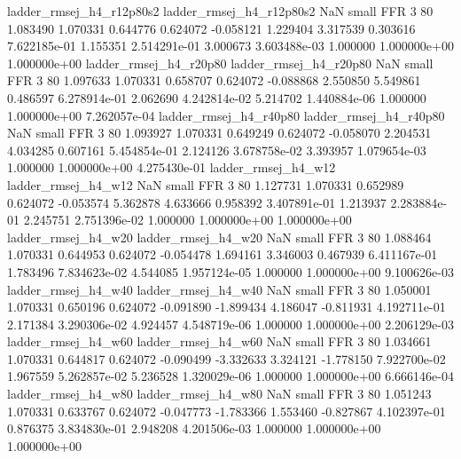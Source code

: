 ladder_rmsej_h4_r12p80s2 ladder_rmsej_h4_r12p80s2                   NaN      small      FFR                 3 80 1.083490       1.070331 0.644776       0.624072   -0.058121      1.229404      3.317539     0.303616   7.622185e-01  1.155351 2.514291e-01     3.000673   3.603488e-03            1.000000    1.000000e+00        1.000000e+00
  ladder_rmsej_h4_r20p80   ladder_rmsej_h4_r20p80                   NaN      small      FFR                 3 80 1.097633       1.070331 0.658707       0.624072   -0.088868      2.550850      5.549861     0.486597   6.278914e-01  2.062690 4.242814e-02     5.214702   1.440884e-06            1.000000    1.000000e+00        7.262057e-04
  ladder_rmsej_h4_r40p80   ladder_rmsej_h4_r40p80                   NaN      small      FFR                 3 80 1.093927       1.070331 0.649249       0.624072   -0.058070      2.204531      4.034285     0.607161   5.454854e-01  2.124126 3.678758e-02     3.393957   1.079654e-03            1.000000    1.000000e+00        4.275430e-01
     ladder_rmsej_h4_w12      ladder_rmsej_h4_w12                   NaN      small      FFR                 3 80 1.127731       1.070331 0.652989       0.624072   -0.053574      5.362878      4.633666     0.958392   3.407891e-01  1.213937 2.283884e-01     2.245751   2.751396e-02            1.000000    1.000000e+00        1.000000e+00
     ladder_rmsej_h4_w20      ladder_rmsej_h4_w20                   NaN      small      FFR                 3 80 1.088464       1.070331 0.644953       0.624072   -0.054478      1.694161      3.346003     0.467939   6.411167e-01  1.783496 7.834623e-02     4.544085   1.957124e-05            1.000000    1.000000e+00        9.100626e-03
     ladder_rmsej_h4_w40      ladder_rmsej_h4_w40                   NaN      small      FFR                 3 80 1.050001       1.070331 0.650196       0.624072   -0.091890     -1.899434      4.186047    -0.811931   4.192711e-01  2.171384 3.290306e-02     4.924457   4.548719e-06            1.000000    1.000000e+00        2.206129e-03
     ladder_rmsej_h4_w60      ladder_rmsej_h4_w60                   NaN      small      FFR                 3 80 1.034661       1.070331 0.644817       0.624072   -0.090499     -3.332633      3.324121    -1.778150   7.922700e-02  1.967559 5.262857e-02     5.236528   1.320029e-06            1.000000    1.000000e+00        6.666146e-04
     ladder_rmsej_h4_w80      ladder_rmsej_h4_w80                   NaN      small      FFR                 3 80 1.051243       1.070331 0.633767       0.624072   -0.047773     -1.783366      1.553460    -0.827867   4.102397e-01  0.876375 3.834830e-01     2.948208   4.201506e-03            1.000000    1.000000e+00        1.000000e+00
